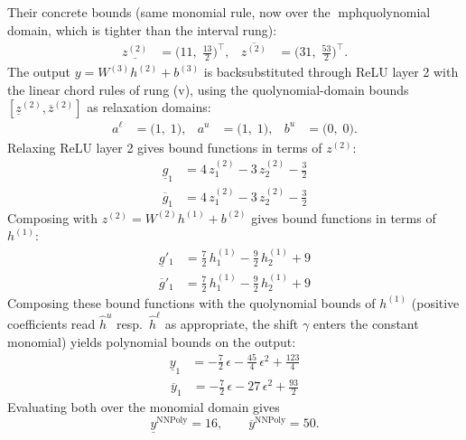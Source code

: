 \documentclass[11pt]{article}
\begin{document}
Their concrete bounds (same monomial rule, now over the mph{quolynomial} domain, which is tighter than the interval rung):
\begin{align*}
\underline{z^{(2)}} &= \bigl(11,\; \frac{13}{2}\bigr)^{\!\top}, & \overline{z^{(2)}} &= \bigl(31,\; \frac{53}{2}\bigr)^{\!\top}.
\end{align*}
The output $y = W^{(3)} h^{(2)} + b^{(3)}$ is backsubstituted through ReLU layer 2 with the linear chord rules of rung (v), using the quolynomial-domain bounds
$[\underline{z}^{(2)}, \overline{z}^{(2)}]$ as relaxation domains:
\begin{align*}
a^{\ell} &= \bigl(1,\; 1\bigr), & a^{u} &= \bigl(1,\; 1\bigr), & b^{u} &= \bigl(0,\; 0\bigr).
\end{align*}
Relaxing ReLU layer 2 gives bound functions in terms of $z^{(2)}$:
\begin{align*}
\underline{g}_{1} &= 4\,z^{(2)}_{1} - 3\,z^{(2)}_{2} - \frac{3}{2}
\end{align*}
\begin{align*}
\overline{g}_{1} &= 4\,z^{(2)}_{1} - 3\,z^{(2)}_{2} - \frac{3}{2}
\end{align*}
Composing with $z^{(2)} = W^{(2)} h^{(1)} + b^{(2)}$ gives bound functions in terms of $h^{(1)}$:
\begin{align*}
\underline{g}'_{1} &= \frac{7}{2}\,h^{(1)}_{1} - \frac{9}{2}\,h^{(1)}_{2} + 9
\end{align*}
\begin{align*}
\overline{g}'_{1} &= \frac{7}{2}\,h^{(1)}_{1} - \frac{9}{2}\,h^{(1)}_{2} + 9
\end{align*}
Composing these bound functions with the quolynomial bounds of $h^{(1)}$ (positive
coefficients read $\hat{h}^{u}$ resp.\ $\hat{h}^{\ell}$ as appropriate, the shift $\gamma$ enters the
constant monomial) yields polynomial bounds on the output:
\begin{align*}
\underline{y}_{1} &= -\frac{7}{2}\,\epsilon - \frac{45}{4}\,\epsilon^2 + \frac{123}{4}
\end{align*}
\begin{align*}
\overline{y}_{1} &= -\frac{7}{2}\,\epsilon - 27\,\epsilon^2 + \frac{93}{2}
\end{align*}
Evaluating both over the monomial domain gives
\begin{equation*}
\underline{y}^{\text{NNPoly}} = 16, \qquad \overline{y}^{\text{NNPoly}} = 50.
\end{equation*}
\end{document}

